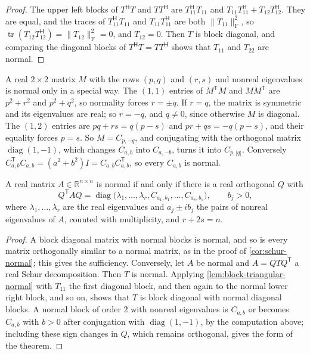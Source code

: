 \begin{proof}
The upper left blocks of $T^{\mathsf H}T$ and $TT^{\mathsf H}$ are $T_{11}^{\mathsf H}T_{11}$ and $T_{11}T_{11}^{\mathsf H}+T_{12}T_{12}^{\mathsf H}$. They are equal, and the traces of $T_{11}^{\mathsf H}T_{11}$ and $T_{11}T_{11}^{\mathsf H}$ are both $\|T_{11}\|_{\mathrm F}^2$, so $\operatorname{tr}(T_{12}T_{12}^{\mathsf H})=\|T_{12}\|_{\mathrm F}^2=0$, and $T_{12}=0$. Then $T$ is block diagonal, and comparing the diagonal blocks of $T^{\mathsf H}T=TT^{\mathsf H}$ shows that $T_{11}$ and $T_{22}$ are normal.
\end{proof}

A real $2\times2$ matrix $M$ with the rows $(p,q)$ and $(r,s)$ and nonreal eigenvalues is normal only in a special way. The $(1,1)$ entries of $M^{\mathsf T}M$ and $MM^{\mathsf T}$ are $p^2+r^2$ and $p^2+q^2$, so normality forces $r=\pm q$. If $r=q$, the matrix is symmetric and its eigenvalues are real; so $r=-q$, and $q\ne0$, since otherwise $M$ is diagonal. The $(1,2)$ entries are $pq+rs=q(p-s)$ and $pr+qs=-q(p-s)$, and their equality forces $p=s$. So $M=C_{p,-q}$, and conjugating with the orthogonal matrix $\operatorname{diag}(1,-1)$, which changes $C_{a,b}$ into $C_{a,-b}$, turns it into $C_{p,|q|}$. Conversely $C_{a,b}^{\mathsf T}C_{a,b}=(a^2+b^2)I=C_{a,b}C_{a,b}^{\mathsf T}$, so every $C_{a,b}$ is normal.

\begin{theorem}
\label{thm:real-normal}
A real matrix $A\in\mathbb R^{n\times n}$ is normal if and only if there is a real orthogonal $Q$ with
\[
Q^{\mathsf T}AQ=\operatorname{diag}\bigl(\lambda_1,\ldots,\lambda_r,C_{a_1,b_1},\ldots,C_{a_s,b_s}\bigr),\qquad b_j>0 ,
\]
where $\lambda_1,\ldots,\lambda_r$ are the real eigenvalues and $a_j\pm ib_j$ the pairs of nonreal eigenvalues of $A$, counted with multiplicity, and $r+2s=n$.
\end{theorem}

\begin{proof}
A block diagonal matrix with normal blocks is normal, and so is every matrix orthogonally similar to a normal matrix, as in the proof of \cref{cor:schur-normal}; this gives the sufficiency. Conversely, let $A$ be normal and $A=QTQ^{\mathsf T}$ a real Schur decomposition. Then $T$ is normal. Applying \cref{lem:block-triangular-normal} with $T_{11}$ the first diagonal block, and then again to the normal lower right block, and so on, shows that $T$ is block diagonal with normal diagonal blocks. A normal block of order $2$ with nonreal eigenvalues is $C_{a,b}$ or becomes $C_{a,b}$ with $b>0$ after conjugation with $\operatorname{diag}(1,-1)$, by the computation above; including these sign changes in $Q$, which remains orthogonal, gives the form of the theorem.
\end{proof}

